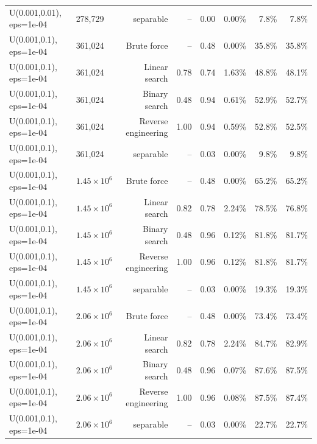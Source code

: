 \begin{tabular}{llrrrrrr}
U(0.001,0.01), eps=1e-04 & 278,729 & separable & -- & 0.00 & 0.00\% & 7.8\% & 7.8\% \\
U(0.001,0.1), eps=1e-04 & 361,024 & Brute force & -- & 0.48 & 0.00\% & 35.8\% & 35.8\% \\
U(0.001,0.1), eps=1e-04 & 361,024 & Linear search & 0.78 & 0.74 & 1.63\% & 48.8\% & 48.1\% \\
U(0.001,0.1), eps=1e-04 & 361,024 & Binary search & 0.48 & 0.94 & 0.61\% & 52.9\% & 52.7\% \\
U(0.001,0.1), eps=1e-04 & 361,024 & Reverse engineering & 1.00 & 0.94 & 0.59\% & 52.8\% & 52.5\% \\
U(0.001,0.1), eps=1e-04 & 361,024 & separable & -- & 0.03 & 0.00\% & 9.8\% & 9.8\% \\
U(0.001,0.1), eps=1e-04 & $1.45\times 10^{6}$ & Brute force & -- & 0.48 & 0.00\% & 65.2\% & 65.2\% \\
U(0.001,0.1), eps=1e-04 & $1.45\times 10^{6}$ & Linear search & 0.82 & 0.78 & 2.24\% & 78.5\% & 76.8\% \\
U(0.001,0.1), eps=1e-04 & $1.45\times 10^{6}$ & Binary search & 0.48 & 0.96 & 0.12\% & 81.8\% & 81.7\% \\
U(0.001,0.1), eps=1e-04 & $1.45\times 10^{6}$ & Reverse engineering & 1.00 & 0.96 & 0.12\% & 81.8\% & 81.7\% \\
U(0.001,0.1), eps=1e-04 & $1.45\times 10^{6}$ & separable & -- & 0.03 & 0.00\% & 19.3\% & 19.3\% \\
U(0.001,0.1), eps=1e-04 & $2.06\times 10^{6}$ & Brute force & -- & 0.48 & 0.00\% & 73.4\% & 73.4\% \\
U(0.001,0.1), eps=1e-04 & $2.06\times 10^{6}$ & Linear search & 0.82 & 0.78 & 2.24\% & 84.7\% & 82.9\% \\
U(0.001,0.1), eps=1e-04 & $2.06\times 10^{6}$ & Binary search & 0.48 & 0.96 & 0.07\% & 87.6\% & 87.5\% \\
U(0.001,0.1), eps=1e-04 & $2.06\times 10^{6}$ & Reverse engineering & 1.00 & 0.96 & 0.08\% & 87.5\% & 87.4\% \\
U(0.001,0.1), eps=1e-04 & $2.06\times 10^{6}$ & separable & -- & 0.03 & 0.00\% & 22.7\% & 22.7\% \\
\bottomrule
\end{tabular}
